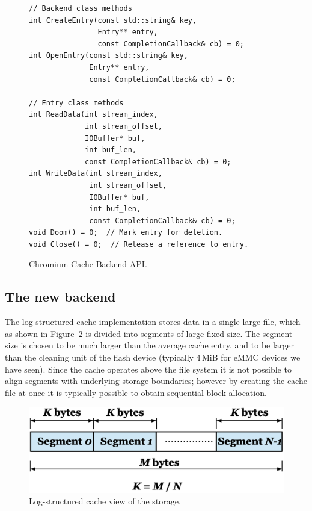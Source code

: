 \documentclass[letterpaper,twocolumn,10pt]{article}
\begin{document}
\begin{figure}[h]
{\small
\begin{verbatim}
// Backend class methods
int CreateEntry(const std::string& key,
                Entry** entry,
                const CompletionCallback& cb) = 0;
int OpenEntry(const std::string& key,
              Entry** entry,
              const CompletionCallback& cb) = 0;

// Entry class methods
int ReadData(int stream_index,
             int stream_offset,
             IOBuffer* buf,
             int buf_len,
             const CompletionCallback& cb) = 0;
int WriteData(int stream_index,
              int stream_offset,
              IOBuffer* buf,
              int buf_len,
              const CompletionCallback& cb) = 0;
void Doom() = 0;  // Mark entry for deletion.
void Close() = 0;  // Release a reference to entry.
\end{verbatim}
}
\caption{Chromium Cache Backend API.}
\label{cache-api}
\end{figure}

\subsection{The new backend}

The log-structured cache implementation stores data in a single large file,
which as shown in Figure~\ref{fig:storage} is divided into segments of large
fixed size.  The segment size is chosen to be much larger than the average cache
entry, and to be larger than the cleaning unit of the flash device (typically
4\,MiB for eMMC devices we have seen).  Since the cache operates above the file
system it is not possible to align segments with underlying storage boundaries;
however by creating the cache file at once it is typically possible to obtain
sequential block allocation.

\begin{figure}[t]
  \begin{center}
    \includegraphics[width=\columnwidth]{graphs/storage}
  \end{center}
  \caption{Log-structured cache view of the storage.}
  \label{fig:storage} 
\end{figure}
\end{document}
